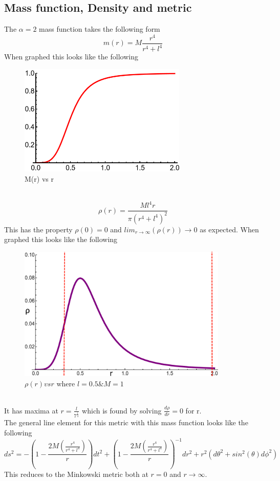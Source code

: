 \documentclass[a4paper,11pt]{article}
\begin{document}
\subsection{Mass function, Density and metric}
The $\alpha = 2$ mass function takes the following form
\begin{equation}
 m(r)=M\frac{r^4}{r^4+l^4}
\end{equation}
When graphed this looks like the following
\\
\begin{figure}[h]
\centering
    \includegraphics[width=8cm]{MF&DF_Graphs/Mass function.png}
    \caption{M(r) vs r}
    \label{fig:my_label}
\end{figure}
\\
\begin{equation}
\rho(r)=\frac{  Ml^{4} r }{ \pi (r^{4}+l^{4})^2}
\end{equation}
This has the property $\rho(0)=0$ and $lim_{r \rightarrow \infty}(\rho(r)) \rightarrow 0 $ as expected. When graphed this looks like the following
\begin{figure}[h]
\centering
    \includegraphics[width=10cm]{MF&DF_Graphs/DensityFunction.png}
    \caption{$\rho (r) vs r$ where $l=0.5 \& M=1$}
    \label{fig:my_label}
\end{figure}
\\
It has maxima at $r=\frac{l}{7^{\frac{1}{4}}}$ which is found by solving $\frac{d\rho}{dr}=0$ for r.
\\
The general line element for this metric with this mass function looks like the following
\begin{equation}
    ds^2=-(1-\frac{2M (\frac{r^{4}}{r^{4}+l^{4}})}{r})dt^2+(1-\frac{2M (\frac{r^{4}}{r^{4}+l^{4}})}{r})^{-1}dr^2+r^2(d\theta^2+sin^2(\theta)d\phi^2)
\end{equation}
This reduces to the Minkowski metric both at $r=0$ and $r\rightarrow \infty$. 
\end{document}
